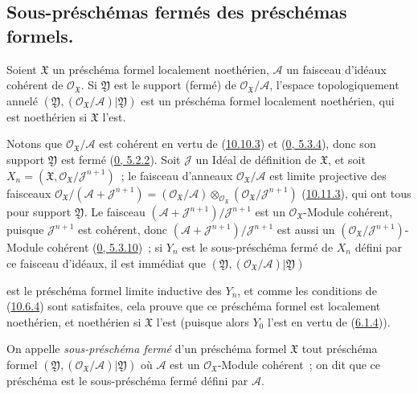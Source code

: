 \subsection{Sous-préschémas fermés des préschémas formels.}
\label{subsection:I.10.14-fr}

\begin{proposition}[10.14.1]
\label{I.10.14.1-fr}
Soient $\mathfrak{X}$ un préschéma formel localement noethérien,
$\mathscr{A}$ un faisceau d'idéaux cohérent de
$\mathscr{O}_{\mathfrak{X}}$. Si $\mathfrak{Y}$ est le support (fermé) de
$\mathscr{O}_{\mathfrak{X}}/\mathscr{A}$, l'espace topologiquement annelé
$(\mathfrak{Y},(\mathscr{O}_{\mathfrak{X}}/\mathscr{A})|\mathfrak{Y})$ est
un préschéma formel localement noethérien, qui est noethérien si
$\mathfrak{X}$ l'est.
\end{proposition}

Notons que $\mathscr{O}_{\mathfrak{X}}/\mathscr{A}$ est cohérent en vertu de
(\hyperref[I.10.10.3-fr]{10.10.3}) et
(\hyperref[0.5.3.4-fr]{0, 5.3.4}), donc son support $\mathfrak{Y}$ est fermé
(\hyperref[0.5.2.2-fr]{0, 5.2.2}). Soit $\mathscr{J}$ un Idéal de définition
de $\mathfrak{X}$, et soit
$X_n=(\mathfrak{X},\mathscr{O}_{\mathfrak{X}}/\mathscr{J}^{n+1})$~; le
faisceau d'anneaux $\mathscr{O}_{\mathfrak{X}}/\mathscr{A}$ est limite
projective des faisceaux
$\mathscr{O}_{\mathfrak{X}}/(\mathscr{A}+\mathscr{J}^{n+1})
=(\mathscr{O}_{\mathfrak{X}}/\mathscr{A})
\otimes_{\mathscr{O}_{\mathfrak{X}}}
(\mathscr{O}_{\mathfrak{X}}/\mathscr{J}^{n+1})$
(\hyperref[I.10.11.3-fr]{10.11.3}), qui ont tous pour support
$\mathfrak{Y}$. Le faisceau
$(\mathscr{A}+\mathscr{J}^{n+1})/\mathscr{J}^{n+1}$ est un
$\mathscr{O}_{\mathfrak{X}}$-Module cohérent, puisque
$\mathscr{J}^{n+1}$ est cohérent, donc
$(\mathscr{A}+\mathscr{J}^{n+1})/\mathscr{J}^{n+1}$ est aussi un
$(\mathscr{O}_{\mathfrak{X}}/\mathscr{J}^{n+1})$-Module cohérent
(\hyperref[0.5.3.10-fr]{0, 5.3.10})~; si $Y_n$ est le sous-préschéma fermé
de $X_n$ défini par ce faisceau d'idéaux, il est immédiat que
$(\mathfrak{Y},(\mathscr{O}_{\mathfrak{X}}/\mathscr{A})|\mathfrak{Y})$

est le préschéma formel limite inductive des $Y_n$, et comme les conditions de
(\hyperref[I.10.6.4-fr]{10.6.4}) sont satisfaites, cela prouve que ce préschéma
formel est localement noethérien, et noethérien si $\mathfrak{X}$ l'est (puisque
alors $Y_0$ l'est en vertu de (\hyperref[I.6.1.4-fr]{6.1.4})).

\begin{definition}[10.14.2]
\label{I.10.14.2-fr}
On appelle \emph{sous-préschéma fermé} d'un préschéma formel $\mathfrak{X}$ tout
préschéma formel
$(\mathfrak{Y},(\mathscr{O}_{\mathfrak{X}}/\mathscr{A})|\mathfrak{Y})$ où
$\mathscr{A}$ est un $\mathscr{O}_{\mathfrak{X}}$-Module cohérent~; on dit que ce
préschéma est le sous-préschéma fermé défini par $\mathscr{A}$.
\end{definition}

